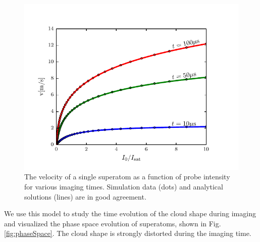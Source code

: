 \documentclass[12pt]{iopart}
\begin{document}
\begin{figure}
	\includegraphics{figure5.pdf}
\caption{The velocity of a single superatom as a function of probe intensity for various imaging times. Simulation data (dots) and analytical solutions (lines) are in good agreement.}  
\label{fig:oneAtomVel}
\end{figure}
\par We use this model to study the time evolution of the cloud shape during imaging and visualized the phase space evolution of superatoms, shown in Fig. \ref{fig:phaseSpace}. The cloud shape is strongly distorted during the imaging time. 
\end{document}
